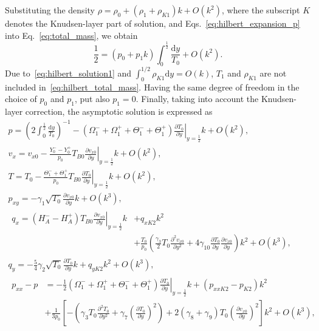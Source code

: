 \documentclass[final]{jfm} %
\newcommand{\dd}{\mathrm{d}}
\newcommand{\pder}[2][]{\frac{\partial#1}{\partial#2}}
\newcommand{\pderdual}[2][]{\frac{\partial^2#1}{\partial#2^2}}
\newcommand{\OO}[1]{O\left(#1\right)}
\begin{document}
Substituting the density \(\rho = \rho_0 + (\rho_1+\rho_{K1})k + \OO{k^2}\),
where the subscript \(K\) denotes the Knudsen-layer part of solution,
and Eqs.~\eqref{eq:hilbert_expansion_p} into Eq.~\eqref{eq:total_mass}, we obtain
\begin{equation}\label{eq:hilbert_total_mass}
    \frac12 = (p_0 + p_1k)\int_{0}^\frac12\frac{\dd y}{T_0} + \OO{k^2}.
\end{equation}
Due to~\eqref{eq:hilbert_solution1} and \(\int_{0}^{1/2}\rho_{K1}\dd{y} = \OO{k}\),
\(T_1\) and \(\rho_{K1}\) are not included in~\eqref{eq:hilbert_total_mass}.
Having the same degree of freedom in the choice of \(p_0\) and \(p_1\), put also \(p_1 = 0\).
Finally, taking into account the Knudsen-layer correction, the asymptotic solution is expressed as
\begin{gather}
    p = \left( 2\int_{0}^\frac12\frac{\dd{y}}{T_0} \right)^{-1}
        - (\Omega_1^-+\Omega_1^+ + \Theta_1^-+\Theta_1^+)\left.\pder[T_0]{y}\right|_{y=\frac12}k + \OO{k^2}, \label{eq:Hilbert_p}\\
    v_x = v_{x0} - \frac{Y_0^--Y_0^+}{p_0}T_{B0}\left.\pder[v_{x0}]{y}\right|_{y=\frac12}k + \OO{k^2}, \label{eq:Hilbert_U}\\
    T = T_0 - \frac{\Theta_1^-+\Theta_1^+}{p_0}T_{B0}\left.\pder[T_0]{y}\right|_{y=\frac12}k + \OO{k^2}, \label{eq:Hilbert_T}\\
    p_{xy} = -\gamma_1\sqrt{T_0}\pder[v_{x0}]{y}k + \OO{k^3}, \label{eq:Hilbert_Pxy}\\
    \begin{aligned}
        q_x = (H_A^--H_A^+)T_{B0}\left.\pder[v_{x0}]{y}\right|_{y=\frac12}k &+ q_{xK2}k^2 \\
        &+ \frac{T_0}{p_0}\left(\frac{\gamma_3}2 T_0 \pderdual[v_{x0}]{y}
        + 4\gamma_{10} \pder[T_0]{y}\pder[v_{x0}]{y}\right)k^2 + \OO{k^3},
    \end{aligned}\label{eq:Hilbert_Qx}\\
    q_y = -\frac54\gamma_2\sqrt{T_0}\pder[T_0]{y}k + q_{yK2}k^2 + \OO{k^3}, \label{eq:Hilbert_Qy}\\
    \begin{aligned}
    p_{xx} - p &= -\frac12 (\Omega_1^-+\Omega_1^+ + \Theta_1^-+\Theta_1^+)\left.\pder[T_0]{y}\right|_{y=\frac12}k
        + (p_{xxK2}-p_{K2})k^2 \\
        &+ \frac1{3p_0}\left[-\left(\gamma_3 T_0 \pderdual[T_0]{y} + \gamma_7\left(\pder[T_0]{y}\right)^2\right)
        + 2(\gamma_8+\gamma_9)T_0\left(\pder[v_{x0}]{y}\right)^2\right]k^2 + \OO{k^3},
    \end{aligned}\label{eq:Hilbert_Pxx}\\

\end{gather}
\end{document}
